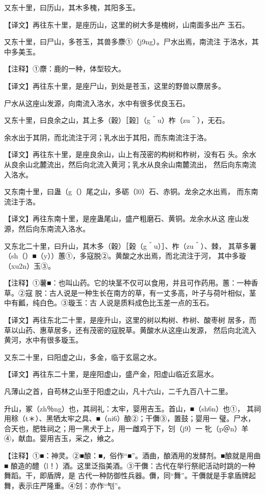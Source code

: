 \documentclass[a4paper,12pt,UTF8,twoside]{ctexbook}
\begin{document}
又东十里，曰历山，其木多槐，其阳多玉。

【译文】再往东十里，是座历山，这里的树大多是槐树，山南面多出产 玉石。

又东十里，曰尸山，多苍玉，其兽多麖①（j9ng）。尸水出焉，南流注 于洛水，其中多美玉。

【注释】①麖：鹿的一种，体型较大。

【译文】再往东十里，是座尸山，到处是苍玉，这里的野兽以麖居多。

尸水从这座山发源，向南流入洛水，水中有很多优良玉石。

又东十里，曰良余之山，其上多（穀）［榖］（g＾u）柞（zu＾），无石。

余水出于其阴，而北流注于河；乳水出于其阳，而东南流注于洛。

【译文】再往东十里，是座良余山，山上有茂密的构树和柞树，没有石 头。余水从良余山北麓流出，然后向北流入黄河；乳水从良余山南麓流出， 然后向东南流入洛水。

又东南十里，曰蛊（g（）尾之山，多砺（l0）石、赤铜。龙余之水出焉， 而东南流注于洛。

【译文】再往东南十里，是座蛊尾山，盛产粗磨石、黄铜。龙余水从这 座山发源，然后向东南流入洛水。

又东北二十里，曰升山，其木多（穀）［榖（g＾u）］、柞（zu＾）、棘， 其草多薯（sh（）■（y））蕙①，多寇脱②。黄酸之水出焉，而北流注于河， 其中多璇（xu2n）玉③。

【注释】①薯■：也叫山药。它的块茎不仅可以食用，并且可作药用。蕙：一种香草。②寇 脱：古人说是一种生长在南方的草，有一丈多高，叶子与荷叶相似，茎中有瓤，纯白色。③璇玉：古 人说是质料成色比玉差一点的玉石。

【译文】再往东北二十里，是座升山，这里的树以构树、柞树、酸枣树 居多，而草以山药、惠草居多，还有茂密的寇脱草。黄酸水从这座山发源， 然后向北流入黄河，水中有很多璇玉。

又东二十里，曰阳虚之山，多金，临于玄扈之水。

【译文】再往东二十里，是座阳虚山，盛产金，阳虚山临近玄扈水。

凡薄山之首，自苟林之山至于阳虚之山，凡十六山，二千九百八十二里。

升山，冢（zh％ng）也，其祠礼：太牢，婴用吉玉。首山，■（sh6n）也①， 其祠用稌（t＊）、黑牺太牢之具、■（ni6）酿②；干儛③，置鼓；婴用一 璧。尸水，合天也，肥牲祠之；用一黑犬于上，用一雌鸡于下，刉（j9）一 牝（p＠n）羊④，献血。婴用吉玉，采之，飨之。

【注释】①■：神灵。②■酿：■，俗作“■”。酒曲，酿酒用的发酵剂。■酿就是用曲■ 酿造的醴（l！）酒。这里泛指美酒。③干儛：古代在举行祭祀活动时跳的一种舞蹈。干，即盾牌，是 古代一种防御性兵器。儛，同“舞”。干儛就是手拿盾牌起舞，表示庄严隆重。④刉：亦作“刏”。
\end{document}
